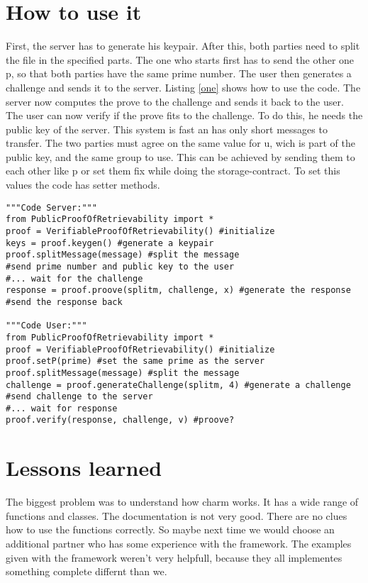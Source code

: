 \documentclass{amsart}
\begin{document}
\section{How to use it}
First, the server has to generate his keypair. After this, both parties need to split the file in the specified parts. The one who starts first has to send the other one p, so that both parties have the same prime number. The user then generates a challenge and sends it to the server. Listing \ref{one} shows how to use the code. The server now computes the prove to the challenge and sends it back to the user. The user can now verify if the prove fits to the challenge. To do this, he needs the public key of the server. This system is fast an has only short messages to transfer. The two parties must agree on the same value for u, wich is part of the public key, and the same group to use. This can be achieved by sending them to each other like p or set them fix while doing the storage-contract. To set this values the code has setter methods.
\lstset{
	breaklines=true,
	language=Python,
	frame=single,
	numbers=left,
	numbersep=5pt
}
\begin{lstlisting}[caption=How to Use the Code, label=one]
"""Code Server:"""
from PublicProofOfRetrievability import *
proof = VerifiableProofOfRetrievability() #initialize
keys = proof.keygen() #generate a keypair
proof.splitMessage(message) #split the message
#send prime number and public key to the user
#... wait for the challenge
response = proof.proove(splitm, challenge, x) #generate the response
#send the response back

"""Code User:"""
from PublicProofOfRetrievability import *
proof = VerifiableProofOfRetrievability() #initialize
proof.setP(prime) #set the same prime as the server
proof.splitMessage(message) #split the message
challenge = proof.generateChallenge(splitm, 4) #generate a challenge
#send challenge to the server
#... wait for response
proof.verify(response, challenge, v) #proove?
\end{lstlisting}

\section{Lessons learned}
The biggest problem was to understand how charm works. It has a wide range of functions and classes. The documentation is not very good. There are no clues how to use the functions correctly. So maybe next time we would choose an additional partner who has some experience with the framework. The examples given with the framework weren't very helpfull, because they all implementes something complete differnt than we.
\end{document}
